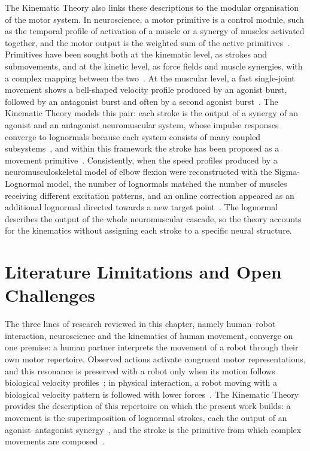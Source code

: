 \documentclass[12pt]{report}
\begin{document}
The Kinematic Theory also links these descriptions to the modular organisation of the motor system. In neuroscience, a motor primitive is a control module, such as the temporal profile of activation of a muscle or a synergy of muscles activated together, and the motor output is the weighted sum of the active primitives~\cite[p.~734]{wolpert2021}. Primitives have been sought both at the kinematic level, as strokes and submovements, and at the kinetic level, as force fields and muscle synergies, with a complex mapping between the two~\cite{flash2005}. At the muscular level, a fast single-joint movement shows a bell-shaped velocity profile produced by an agonist burst, followed by an antagonist burst and often by a second agonist burst~\cite[p.~755]{enoka2021}. The Kinematic Theory models this pair: each stroke is the output of a synergy of an agonist and an antagonist neuromuscular system, whose impulse responses converge to lognormals because each system consists of many coupled subsystems~\cite{plamondon2003}, and within this framework the stroke has been proposed as a movement primitive~\cite{woch2004}. Consistently, when the speed profiles produced by a neuromusculoskeletal model of elbow flexion were reconstructed with the Sigma-Lognormal model, the number of lognormals matched the number of muscles receiving different excitation patterns, and an online correction appeared as an additional lognormal directed towards a new target point~\cite[pp.~55, 75]{parziale2016}. The lognormal describes the output of the whole neuromuscular cascade, so the theory accounts for the kinematics without assigning each stroke to a specific neural structure.

\section{Literature Limitations and Open Challenges}
The three lines of research reviewed in this chapter, namely human--robot interaction, neuroscience and the kinematics of human movement, converge on one premise: a human partner interprets the movement of a robot through their own motor repertoire. Observed actions activate congruent motor representations, and this resonance is preserved with a robot only when its motion follows biological velocity profiles~\cite{kupferberg2011,bisio2014}; in physical interaction, a robot moving with a biological velocity pattern is followed with lower forces~\cite{maurice2018}. The Kinematic Theory provides the description of this repertoire on which the present work builds: a movement is the superimposition of lognormal strokes, each the output of an agonist--antagonist synergy~\cite{plamondon2003}, and the stroke is the primitive from which complex movements are composed~\cite{woch2004}.
\end{document}
